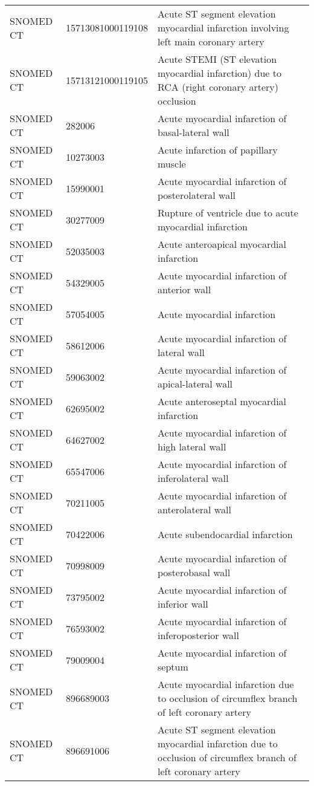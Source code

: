 \begin{longtable}{p{}p{}p{}}
  SNOMED CT & 15713081000119108 & Acute ST segment elevation myocardial infarction involving left main coronary artery \\ 
  SNOMED CT & 15713121000119105 & Acute STEMI (ST elevation myocardial infarction) due to RCA (right coronary artery) occlusion \\ 
  SNOMED CT & 282006 & Acute myocardial infarction of basal-lateral wall \\ 
  SNOMED CT & 10273003 & Acute infarction of papillary muscle \\ 
  SNOMED CT & 15990001 & Acute myocardial infarction of posterolateral wall \\ 
  SNOMED CT & 30277009 & Rupture of ventricle due to acute myocardial infarction \\ 
  SNOMED CT & 52035003 & Acute anteroapical myocardial infarction \\ 
  SNOMED CT & 54329005 & Acute myocardial infarction of anterior wall \\ 
  SNOMED CT & 57054005 & Acute myocardial infarction \\ 
  SNOMED CT & 58612006 & Acute myocardial infarction of lateral wall \\ 
  SNOMED CT & 59063002 & Acute myocardial infarction of apical-lateral wall \\ 
  SNOMED CT & 62695002 & Acute anteroseptal myocardial infarction \\ 
  SNOMED CT & 64627002 & Acute myocardial infarction of high lateral wall \\ 
  SNOMED CT & 65547006 & Acute myocardial infarction of inferolateral wall \\ 
  SNOMED CT & 70211005 & Acute myocardial infarction of anterolateral wall \\ 
  SNOMED CT & 70422006 & Acute subendocardial infarction \\ 
  SNOMED CT & 70998009 & Acute myocardial infarction of posterobasal wall \\ 
  SNOMED CT & 73795002 & Acute myocardial infarction of inferior wall \\ 
  SNOMED CT & 76593002 & Acute myocardial infarction of inferoposterior wall \\ 
  SNOMED CT & 79009004 & Acute myocardial infarction of septum \\ 
  SNOMED CT & 896689003 & Acute myocardial infarction due to occlusion of circumflex branch of left coronary artery \\ 
  SNOMED CT & 896691006 & Acute ST segment elevation myocardial infarction due to occlusion of circumflex branch of left coronary artery \\ 

\end{longtable}
